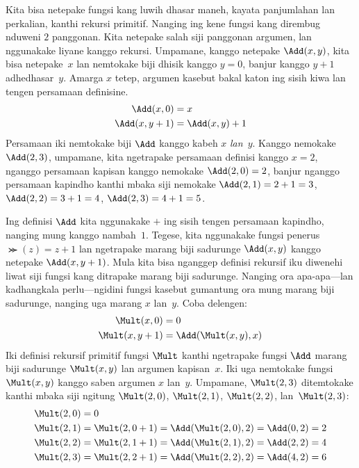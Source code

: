 \documentclass[../../../include/open-logic-section]{subfiles}
\begin{document}
Kita bisa netepake fungsi kang luwih dhasar maneh, kayata
panjumlahan lan perkalian, kanthi rekursi primitif. Nanging
ing kene fungsi kang dirembug nduweni $2$ panggonan.
Kita netepake salah siji panggonan argumen, lan nggunakake
liyane kanggo rekursi. Umpamane, kanggo netepake
$\Add(x, y)$, kita bisa netepake~$x$ lan nemtokake biji
dhisik kanggo $y=0$, banjur kanggo $y+1$ adhedhasar~$y$.
Amarga $x$ tetep, argumen kasebut bakal katon ing sisih kiwa lan tengen
persamaan definisine.
\begin{align*}
\Add(x,0) & =  x\\
\Add(x,y+1) & =  \Add(x,y)+1
\end{align*}
Persamaan iki nemtokake biji $\Add$ kanggo kabeh $x$
\emph{lan}~$y$. Kanggo nemokake $\Add(2,3)$, umpamane,
kita ngetrapake persamaan definisi kanggo $x = 2$,
nganggo persamaan kapisan kanggo nemokake
$\Add(2,0) = 2$, banjur nganggo persamaan kapindho
kanthi mbaka siji nemokake $\Add(2,1) = 2 + 1 = 3$,
$\Add(2, 2) = 3 + 1 = 4$, $\Add(2,
3) = 4 + 1 = 5$.

Ing definisi $\Add$ kita nggunakake $+$ ing sisih tengen
persamaan kapindho, nanging mung kanggo nambah~$1$.
Tegese, kita nggunakake fungsi penerus $\Succ(z) = z+1$
lan ngetrapake marang biji sadurunge $\Add(x,y)$
kanggo netepake $\Add(x,y+1)$. Mula kita bisa nganggep
definisi rekursif iku diwenehi liwat siji fungsi kang
ditrapake marang biji sadurunge. Nanging ora apa-apa---lan
kadhangkala perlu---ngidini fungsi kasebut gumantung ora
mung marang biji sadurunge, nanging uga marang $x$ lan~$y$.
Coba delengen:
\begin{align*}
  \Mult(x,0) & =  0 \\
  \Mult(x,y+1) & =  \Add(\Mult(x,y),x)
\end{align*}
Iki definisi rekursif primitif fungsi $\Mult$ kanthi
ngetrapake fungsi $\Add$ marang biji sadurunge
$\Mult(x,y)$ lan argumen kapisan~$x$. Iki uga nemtokake
fungsi~$\Mult(x,y)$ kanggo saben argumen $x$ lan~$y$.
Umpamane, $\Mult(2,3)$ ditemtokake kanthi mbaka siji
ngitung $\Mult(2,0)$, $\Mult(2,1)$, $\Mult(2,2)$,
lan~$\Mult(2,3)$:
\begin{align*}
  \Mult(2,0) & = 0\\
  \Mult(2,1) & = \Mult(2,0+1) =
  \Add(\Mult(2,0), 2) = \Add(0, 2) = 2\\
  \Mult(2,2) & = \Mult(2,1+1) =
  \Add(\Mult(2,1), 2) = \Add(2, 2) = 4\\
  \Mult(2,3) & = \Mult(2,2+1) =
  \Add(\Mult(2,2), 2) = \Add(4, 2) = 6
\end{align*}
\end{document}
